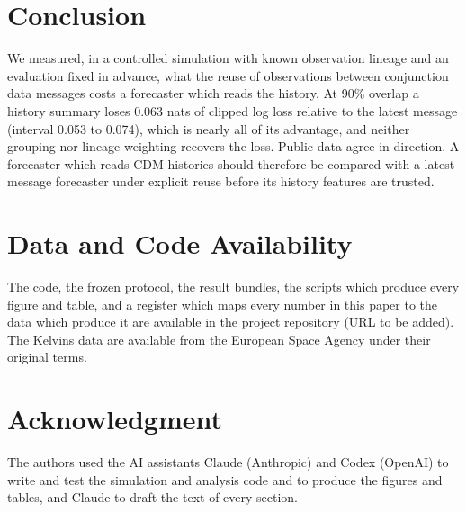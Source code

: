 \documentclass[conference]{IEEEtran}
\begin{document}
\section{Conclusion}

We measured, in a controlled simulation with known observation lineage and an evaluation fixed in advance, what the reuse of observations between conjunction data messages costs a forecaster which reads the history.
At 90\% overlap a history summary loses 0.063 nats of clipped log loss relative to the latest message (interval 0.053 to 0.074), which is nearly all of its advantage, and neither grouping nor lineage weighting recovers the loss. Public data agree in direction. A forecaster which reads CDM histories should therefore be compared with a latest-message forecaster under explicit reuse before its history features are trusted.

\section*{Data and Code Availability}
The code, the frozen protocol, the result bundles, the scripts which produce every figure and table, and a register which maps every number in this paper to the data which produce it are available in the project repository (URL to be added). The Kelvins data are available from the European Space Agency under their original terms.

\section*{Acknowledgment}
The authors used the AI assistants Claude (Anthropic) and Codex (OpenAI) to write and test the simulation and analysis code and to produce the figures and tables, and Claude to draft the text of every section.
\end{document}
